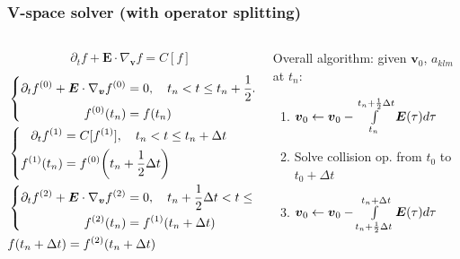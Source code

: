 \documentclass[mathserif, aspectratio=169]{beamer}
\newcommand{\vect}[1]{\boldsymbol{#1}}
\newcommand{\of}[1]{\mleft( #1 \mright)}
\newcommand{\myint}{\int\limits}
\begin{document}
\begin{frame}
\frametitle{V-space solver (with operator splitting)}
\begin{columns}
	\begin{column}{0.5\textwidth}
		\begin{center}
			\small
			\begin{align*}
			\partial_t f + \vect{E}\cdot \nabla_{\vect{v}} f = C[f]
			\end{align*}
			\begin{align*}
			&\left\{
			\begin{aligned}
			\partial_t f^{(0)} + \vect{E}\cdot \nabla_{\vect{v}} f^{(0)} &= 0, \quad t_n < t \leq t_n + \frac12 \Delta t \\
			f^{(0)}\of{t_n} &= f\of{t_n}
			\end{aligned}
			\right.
			\\
			&\left\{
			\begin{aligned}
			\partial_t f^{(1)} &= C[f^{(1)}], \quad t_n < t \leq t_n + \Delta t \\
			f^{(1)}\of{t_n} &= f^{(0)}\of{t_n + \frac12 \Delta t}
			\end{aligned}
			\right.
			\\
			&\left\{
			\begin{aligned}
			\partial_t f^{(2)} + \vect{E}\cdot \nabla_{\vect{v}} f^{(2)} &= 0, \quad t_n + \frac12 \Delta t < t \leq t_n + \Delta t  \\
			f^{(2)}\of{t_n} &= f^{(1)}\of{t_n + \Delta t}
			\end{aligned}
			\right.
			\\
			& f\of{t_n + \Delta t} = f^{(2)}\of{t_n + \Delta t}
			\end{align*}
		\end{center}
	\end{column}
	\begin{column}{0.5\textwidth}  %
		\begin{center}
			Overall algorithm: given $\vect{v}_0$, $a_{klm}$ at $t_n$:
			\begin{enumerate}
				\item $\vect{v}_0 \leftarrow \vect{v}_0 - \myint_{t_n}^{t_n+\frac12 \Delta t} \vect{E}\of{\tau} d\tau$
				\item Solve collision op.  from $t_0$ to $t_0 + \Delta t$
				\item $\vect{v}_0 \leftarrow \vect{v}_0 - \myint_{t_n+\frac12 \Delta t}^{t_n + \Delta t} \vect{E}\of{\tau} d\tau$
			\end{enumerate}
		\end{center}
	\end{column}
\end{columns}
\end{frame}
\end{document}
